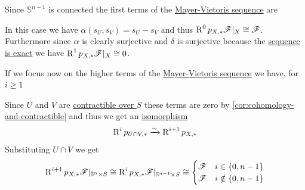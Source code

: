 \documentclass[../../main]{subfiles}
\begin{document}
\begin{example}[\(\mathbb{S}^{n}\)]
  Since \(\mathbb{S}^{n-1}\) is connected the first terms of the \hyperref[thm:mayer-vietoris-open]{Mayer-Vietoris sequence} are
  \begin{center}
  \end{center}
  In this case we have \(\alpha(s_{U}, s_{V}) = s_{U} - s_{V}\) and thus \(\operatorname{R}^{0}p_{X, \ast}\mathscr{F}|_{X} \cong \mathscr{F}\).
  Furthermore since \(\alpha\) is clearly surjective and \(\delta\) is surjective because the \hyperref[def:exact-sequence]{sequence is exact} we have \(\operatorname{R}^{1}p_{X, \ast}\mathscr{F}|_{X} \cong 0\).

  If we focus now on the higher terms of the \hyperref[thm:mayer-vietoris-open]{Mayer-Vietoris sequence} we have, for \(i \geq 1\)
  \begin{center}
  \end{center}
  Since \(U\) and \(V\) are \hyperref[def:homotopy-over]{contractible over \(S\)} these terms are zero by \autoref{cor:cohomology-and-contractible} and thus we get an \hyperref[def:categorical-isomorphism]{isomorphism}
  \begin{equation*}
    \operatorname{R}^{i}p_{U \cap V, \ast} \xrightarrow{\sim} \operatorname{R}^{i+1}p_{X, \ast}
  \end{equation*}
  Substituting \(U \cap V\) we get
  \begin{equation*}
    \operatorname{R}^{i+1}p_{X, \ast} \mathscr{F}|_{\mathbb{S}^{n} \times S} \cong \operatorname{R}^{i}p_{X, \ast} \mathscr{F}|_{\mathbb{S}^{n-1} \times S} \cong \begin{cases}
      \mathscr{F} & i \in \{0, n-1\} \\
      \mathscr{F} & i \notin \{0, n-1\}
    \end{cases}
  \end{equation*}
  

\end{example}
\end{document}

